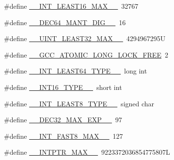 \begin{DoxyCompactItemize}
\item 
\#define \hyperlink{build-analizer__host-_desktop___qt__5__9__0___g_c_c__64bit-_release_2moc__predefs_8h_a4f3694eafdad4edb2bfe114a06553dec}{\+\_\+\+\_\+\+I\+N\+T\+\_\+\+L\+E\+A\+S\+T16\+\_\+\+M\+A\+X\+\_\+\+\_\+}~32767
\item 
\#define \hyperlink{build-analizer__host-_desktop___qt__5__9__0___g_c_c__64bit-_release_2moc__predefs_8h_a61c258ffad919b338b83e1401265f671}{\+\_\+\+\_\+\+D\+E\+C64\+\_\+\+M\+A\+N\+T\+\_\+\+D\+I\+G\+\_\+\+\_\+}~16
\item 
\#define \hyperlink{build-analizer__host-_desktop___qt__5__9__0___g_c_c__64bit-_release_2moc__predefs_8h_a281ab632befbb2d5567ff114e2fa18f9}{\+\_\+\+\_\+\+U\+I\+N\+T\+\_\+\+L\+E\+A\+S\+T32\+\_\+\+M\+A\+X\+\_\+\+\_\+}~4294967295\+U
\item 
\#define \hyperlink{build-analizer__host-_desktop___qt__5__9__0___g_c_c__64bit-_release_2moc__predefs_8h_af6547beba0a34ed6bd6453f1220a97ca}{\+\_\+\+\_\+\+G\+C\+C\+\_\+\+A\+T\+O\+M\+I\+C\+\_\+\+L\+O\+N\+G\+\_\+\+L\+O\+C\+K\+\_\+\+F\+R\+E\+E}~2
\item 
\#define \hyperlink{build-analizer__host-_desktop___qt__5__9__0___g_c_c__64bit-_release_2moc__predefs_8h_aadf1477c4b8076c939fb4fdeca6f4b8e}{\+\_\+\+\_\+\+I\+N\+T\+\_\+\+L\+E\+A\+S\+T64\+\_\+\+T\+Y\+P\+E\+\_\+\+\_\+}~long int
\item 
\#define \hyperlink{build-analizer__host-_desktop___qt__5__9__0___g_c_c__64bit-_release_2moc__predefs_8h_a6770e92cfa87964cfcf358a6358f5347}{\+\_\+\+\_\+\+I\+N\+T16\+\_\+\+T\+Y\+P\+E\+\_\+\+\_\+}~short int
\item 
\#define \hyperlink{build-analizer__host-_desktop___qt__5__9__0___g_c_c__64bit-_release_2moc__predefs_8h_a1801bfbb7ab3b0ff09a48c3d78bd97e2}{\+\_\+\+\_\+\+I\+N\+T\+\_\+\+L\+E\+A\+S\+T8\+\_\+\+T\+Y\+P\+E\+\_\+\+\_\+}~signed char
\item 
\#define \hyperlink{build-analizer__host-_desktop___qt__5__9__0___g_c_c__64bit-_release_2moc__predefs_8h_aabb9dbf55546af708a50831a7c48d9b9}{\+\_\+\+\_\+\+D\+E\+C32\+\_\+\+M\+A\+X\+\_\+\+E\+X\+P\+\_\+\+\_\+}~97
\item 
\#define \hyperlink{build-analizer__host-_desktop___qt__5__9__0___g_c_c__64bit-_release_2moc__predefs_8h_ab11d0b7a18b7d57dff361c0848f28e09}{\+\_\+\+\_\+\+I\+N\+T\+\_\+\+F\+A\+S\+T8\+\_\+\+M\+A\+X\+\_\+\+\_\+}~127
\item 
\#define \hyperlink{build-analizer__host-_desktop___qt__5__9__0___g_c_c__64bit-_release_2moc__predefs_8h_ae19860f43757eb1fc151b38cb3bbc278}{\+\_\+\+\_\+\+I\+N\+T\+P\+T\+R\+\_\+\+M\+A\+X\+\_\+\+\_\+}~9223372036854775807\+L

\end{DoxyCompactItemize}
